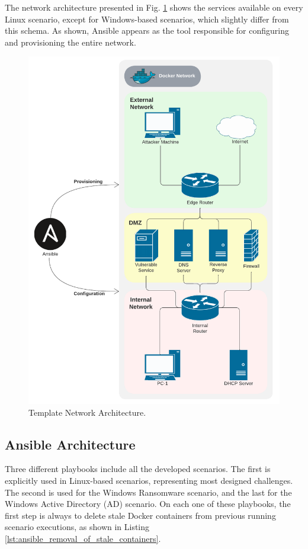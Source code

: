 The network architecture presented in Fig. \ref{fig:template_net} shows the services available on every Linux scenario, except for Windows-based scenarios, which slightly differ from this schema. As shown, Ansible appears as the tool responsible for configuring and provisioning the entire network.

\begin{figure}[H]
    \includegraphics[width=12cm]{figures/example.pdf}
    \caption{Template Network Architecture.}
    \label{fig:template_net}
\end{figure}

\subsection{Ansible Architecture} \label{sec:ansible_structure}

Three different playbooks include all the developed scenarios. The first is explicitly used in Linux-based scenarios, representing most designed challenges. The second is used for the Windows Ransomware scenario, and the last for the Windows Active Directory (AD) scenario. On each one of these playbooks, the first step is always to delete stale Docker containers from previous running scenario executions, as shown in Listing \ref{lst:ansible_removal_of_stale_containers}.

